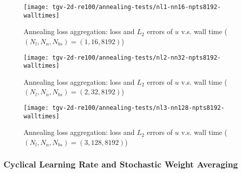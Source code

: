 \begin{figure}[hbt!]
    \centering%
    \texttt{[image: tgv-2d-re100/annealing-tests/nl1-nn16-npts8192-walltimes]}%
    \caption[%
        Annealing loss aggregation: loss and $L_2$ errors of $u$ v.s. wall time ($(N_l, N_n, N_{bs})=(1, 16, 8192)$)%
    ]{%
        Annealing loss aggregation: loss and $L_2$ errors of $u$ v.s. wall time ($(N_l, N_n, N_{bs})=(1, 16, 8192)$)%
    }\label{fig:annealing-tests-nl1-nn16-npts8192-walltimes}%
\end{figure}

\begin{figure}[hbt!]
    \centering%
    \texttt{[image: tgv-2d-re100/annealing-tests/nl2-nn32-npts8192-walltimes]}%
    \caption[%
        Annealing loss aggregation: loss and $L_2$ errors of $u$ v.s. wall time ($(N_l, N_n, N_{bs})=(2, 32, 8192)$)%
    ]{%
        Annealing loss aggregation: loss and $L_2$ errors of $u$ v.s. wall time ($(N_l, N_n, N_{bs})=(2, 32, 8192)$)%
    }\label{fig:annealing-tests-nl2-nn32-npts8192-walltimes}%
\end{figure}

\begin{figure}[hbt!]
    \centering%
    \texttt{[image: tgv-2d-re100/annealing-tests/nl3-nn128-npts8192-walltimes]}%
    \caption[%
        Annealing loss aggregation: loss and $L_2$ errors of $u$ v.s. wall time ($(N_l, N_n, N_{bs})=(3, 128, 8192)$)%
    ]{%
        Annealing loss aggregation: loss and $L_2$ errors of $u$ v.s. wall time ($(N_l, N_n, N_{bs})=(3, 128, 8192)$)%
    }\label{fig:annealing-tests-nl3-nn128-npts8192-walltimes}%
\end{figure}

\subsubsection{Cyclical Learning Rate and Stochastic Weight Averaging}


